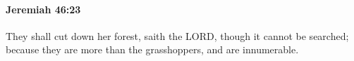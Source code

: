 
		\paragraph{Jeremiah 46:23} %
			\label{JEREMIAH-46-23}

			They shall cut down her forest, saith the LORD, though it cannot be searched; because they are more than the grasshoppers, and are innumerable.


